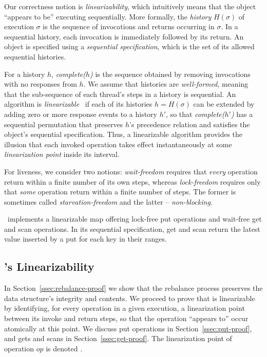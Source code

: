 Our correctness notion is \emph{linearizability}, which intuitively means that the object ``appears to be'' executing sequentially. 
More formally, the \emph{history} $H(\sigma)$ of execution $\sigma$ is the sequence of invocations  and returns occurring in $\sigma$. 
In a sequential history, each invocation is immediately followed by its return. 
An object is specified using a \emph{sequential specification}, which is the set of its allowed sequential histories. 

For a history $h$, \emph{complete($h$)} is the sequence obtained by removing invocations with no responses from $h$.
We assume that histories are \emph{well-formed}, meaning that the sub-sequence of each thread's steps in a history is sequential.
An algorithm is \emph{linearizable}~\cite{HerlihyW1990} if each of its histories $h=H(\sigma)$ can be extended by adding zero or more response events to a history $h'$, 
so that  \emph{complete($h'$)} has a sequential permutation that preserves $h$'s precedence relation and satisfies the object's sequential specification. 
Thus, a linearizable algorithm provides the illusion that each invoked operation takes effect instantaneously at some  \emph{linearization point} inside its interval. 

For liveness, we consider two notions: \emph{wait-freedom} requires that \emph{every} operation return within a finite number of its own steps, whereas \emph{lock-freedom}  
requires only that \emph{some} operation return within a finite number of steps. The former is sometimes called \emph{starvation-freedom} and the latter -- \emph{non-blocking}. 

\kiwi\ implements a linearizable map offering lock-free put operations and wait-free get and scan operations. 
In its sequential specification, get and scan return the latest value inserted by a put for each key in their ranges.





\subsection{\kiwi's Linearizability}
\label{sec:safe}

In Section~\ref{ssec:rebalance-proof} we show that the rebalance process preserves the data structure's integrity and contents. 
We proceed to prove that  {\kiwi} is linearizable by identifying, for every operation in a given execution, a {linearization point} between its invoke and return steps, so that the operation ``appears to'' occur atomically at this point.  We discuss put operations in Section~\ref{ssec:put-proof}, and gets and scans in Section~\ref{ssec:get-proof}. 
The linearization point of operation $op$ is denoted . 



